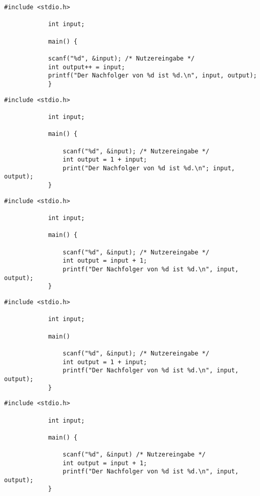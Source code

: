 \documentclass[]{article}
\begin{document}
	\begin{minipage}{0.5\linewidth} %
		\begin{lstlisting}[gobble=6]
			#include <stdio.h>
			
			int input;
			
			main() {
			
			scanf("%d", &input); /* Nutzereingabe */
			int output++ = input;
			printf("Der Nachfolger von %d ist %d.\n", input, output);
			}
		\end{lstlisting}
	\end{minipage}
	\quad
	\begin{minipage}{0.5\linewidth} %
		\begin{lstlisting}[gobble=6]
			#include <stdio.h>
			
			int input;
			
			main() {
			
				scanf("%d", &input); /* Nutzereingabe */
				int output = 1 + input;
				print("Der Nachfolger von %d ist %d.\n"; input, output);
			}
		\end{lstlisting}
	\end{minipage}
	\begin{minipage}{0.5\linewidth} %
		\begin{lstlisting}[gobble=6]
			#include <stdio.h>
			
			int input;
			
			main() {
			
				scanf("%d", &input); /* Nutzereingabe */
				int output = input + 1;
				printf("Der Nachfolger von %d ist %d.\n", input, output);
			}
		\end{lstlisting}
	\end{minipage}
	\quad
	\begin{minipage}{0.5\linewidth} %
		\begin{lstlisting}[gobble=6]
			#include <stdio.h>
			
			int input;
			
			main() 
			
				scanf("%d", &input); /* Nutzereingabe */
				int output = 1 + input;
				printf("Der Nachfolger von %d ist %d.\n", input, output);
			}
		\end{lstlisting}
	\end{minipage}
	\begin{minipage}{0.5\linewidth} %
		\begin{lstlisting}[gobble=6]
			#include <stdio.h>
			
			int input;
			
			main() {
			
				scanf("%d", &input) /* Nutzereingabe */
				int output = input + 1;
				printf("Der Nachfolger von %d ist %d.\n", input, output);
			}
		\end{lstlisting}
	\end{minipage}
\end{document}
